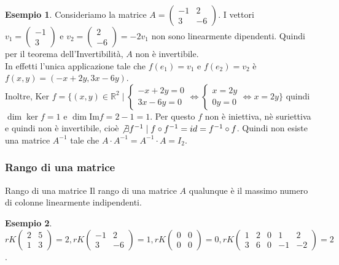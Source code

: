 \documentclass[a4paper]{article}
\theoremstyle{definition}
\newtheorem*{es}{Esempio}
\begin{document}
\begin{es}
	Consideriamo la matrice $A = \begin{pmatrix}
			-1 & 2  \\
			3  & -6
		\end{pmatrix}$. I vettori $v_1 = \begin{pmatrix}
			-1 \\
			3
		\end{pmatrix} \text{ e } v_2 = \begin{pmatrix}
			2 \\
			-6
		\end{pmatrix} = -2v_1$ non sono linearmente dipendenti. Quindi per il teorema dell'Invertibilità, $A$ non è invertibile. \\
	In effetti l'unica applicazione tale che $f(e_1) = v_1$ e $f(e_2) = v_2$ è $f(x, y) = (-x + 2y, 3x - 6y)$. \\
	Inoltre, Ker $f = \{(x, y) \in \mathbb{R}^2 \mid \begin{cases}
			-x + 2y = 0 \\
			3x - 6y = 0
		\end{cases} \Leftrightarrow \begin{cases}
			x = 2y \\
			0y = 0
		\end{cases} \Leftrightarrow x = 2y\}$ quindi $\dim \ker f = 1$ e $\dim \text{Im} f = 2 - 1 = 1$.
	Per questo $f$ non è iniettiva, nè suriettiva e quindi non è invertibile, cioè $\not\exists f^{-1} \mid f \circ f^{-1} = id = f^{-1} \circ f$.
	Quindi non esiste una matrice $A^{-1}$ tale che $A \cdot A^{-1} = A^{-1} \cdot A = I_2$.
\end{es}

\subsubsection{Rango di una matrice}
\begin{deff}{Rango di una matrice}{}
	Il rango di una matrice $A$ qualunque è il massimo numero di colonne linearmente indipendenti.
\end{deff}

\begin{es}
	$rK\begin{pmatrix}
			2 & 5 \\
			1 & 3
		\end{pmatrix} = 2, rK\begin{pmatrix}
			-1 & 2  \\
			3  & -6
		\end{pmatrix} = 1, rK\begin{pmatrix}
			0 & 0 \\
			0 & 0
		\end{pmatrix} = 0, rK\begin{pmatrix}
			1 & 2 & 0 & 1  & 2  \\
			3 & 6 & 0 & -1 & -2
		\end{pmatrix} = 2$.
\end{es}
\end{document}

